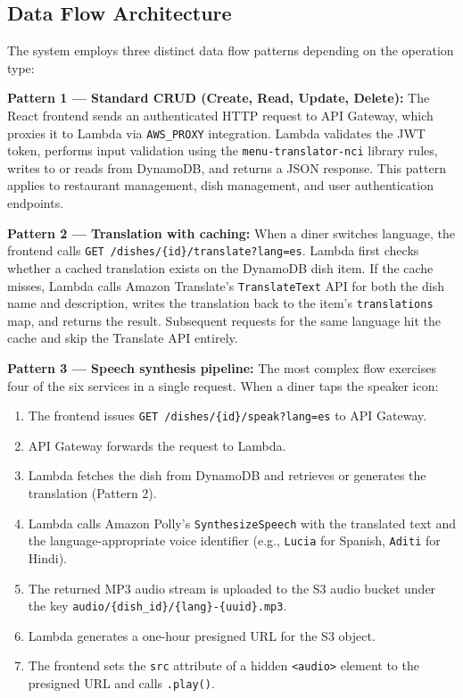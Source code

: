 \documentclass[conference]{IEEEtran}
\begin{document}
\subsection{Data Flow Architecture}

The system employs three distinct data flow patterns depending on the operation type:

\textbf{Pattern 1 --- Standard CRUD (Create, Read, Update, Delete):} The React frontend sends an authenticated HTTP request to API Gateway, which proxies it to Lambda via \texttt{AWS\_PROXY} integration. Lambda validates the JWT token, performs input validation using the \texttt{menu-translator-nci} library rules, writes to or reads from DynamoDB, and returns a JSON response. This pattern applies to restaurant management, dish management, and user authentication endpoints.

\textbf{Pattern 2 --- Translation with caching:} When a diner switches language, the frontend calls \texttt{GET /dishes/\{id\}/translate?lang=es}. Lambda first checks whether a cached translation exists on the DynamoDB dish item. If the cache misses, Lambda calls Amazon Translate's \texttt{TranslateText} API for both the dish name and description, writes the translation back to the item's \texttt{translations} map, and returns the result. Subsequent requests for the same language hit the cache and skip the Translate API entirely.

\textbf{Pattern 3 --- Speech synthesis pipeline:} The most complex flow exercises four of the six services in a single request. When a diner taps the speaker icon:

\begin{enumerate}[leftmargin=*]
    \item The frontend issues \texttt{GET /dishes/\{id\}/speak?lang=es} to API Gateway.
    \item API Gateway forwards the request to Lambda.
    \item Lambda fetches the dish from DynamoDB and retrieves or generates the translation (Pattern 2).
    \item Lambda calls Amazon Polly's \texttt{SynthesizeSpeech} with the translated text and the language-appropriate voice identifier (e.g., \texttt{Lucia} for Spanish, \texttt{Aditi} for Hindi).
    \item The returned MP3 audio stream is uploaded to the S3 audio bucket under the key \texttt{audio/\{dish\_id\}/\{lang\}-\{uuid\}.mp3}.
    \item Lambda generates a one-hour presigned URL for the S3 object.
    \item The frontend sets the \texttt{src} attribute of a hidden \texttt{<audio>} element to the presigned URL and calls \texttt{.play()}.
\end{enumerate}
\end{document}
